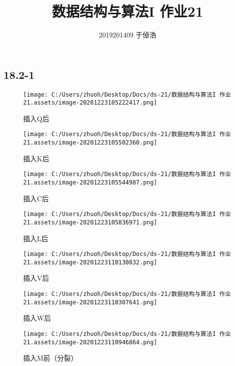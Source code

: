 \documentclass[]{article}
\title{数据结构与算法I 作业21}
\author{2019201409 于倬浩}
\begin{document}
\maketitle

\hypertarget{header-n65}{%
\subsection{18.2-1}\label{header-n65}}

\begin{figure}[H]
\centering
\texttt{[image: C:/Users/zhuoh/Desktop/Docs/ds-21/数据结构与算法I 作业21.assets/image-20201223105222417.png]}
\caption{插入Q后}
\end{figure}


\begin{figure}[H]
\centering
\texttt{[image: C:/Users/zhuoh/Desktop/Docs/ds-21/数据结构与算法I 作业21.assets/image-20201223105502360.png]}
\caption{插入K后}
\end{figure}

\begin{figure}[H]
\centering
\texttt{[image: C:/Users/zhuoh/Desktop/Docs/ds-21/数据结构与算法I 作业21.assets/image-20201223105544987.png]}
\caption{插入C后}
\end{figure}


\begin{figure}[H]
\centering
\texttt{[image: C:/Users/zhuoh/Desktop/Docs/ds-21/数据结构与算法I 作业21.assets/image-20201223105836971.png]}
\caption{插入L后}
\end{figure}


\begin{figure}[H]
\centering
\texttt{[image: C:/Users/zhuoh/Desktop/Docs/ds-21/数据结构与算法I 作业21.assets/image-20201223110130832.png]}
\caption{插入V后}
\end{figure}

\begin{figure}[H]
\centering
\texttt{[image: C:/Users/zhuoh/Desktop/Docs/ds-21/数据结构与算法I 作业21.assets/image-20201223110307641.png]}
\caption{插入W后}
\end{figure}


\begin{figure}[H]
\centering
\texttt{[image: C:/Users/zhuoh/Desktop/Docs/ds-21/数据结构与算法I 作业21.assets/image-20201223110946864.png]}
\caption{插入M前（分裂）}
\end{figure}
\end{document}
